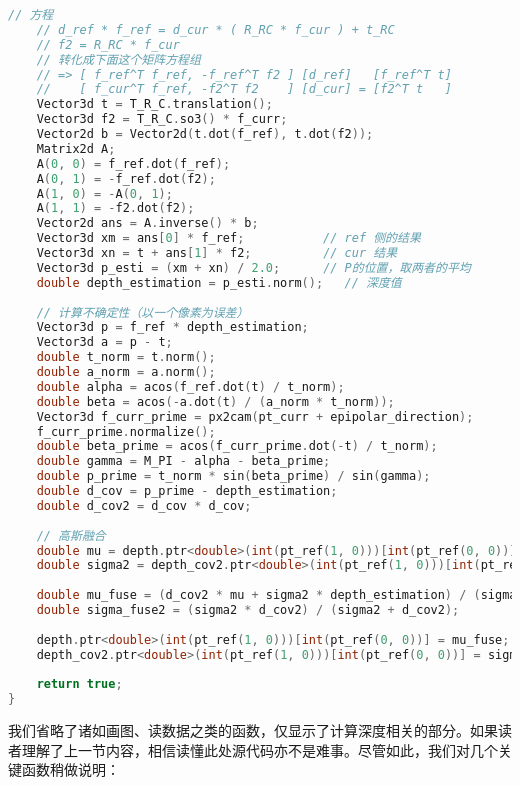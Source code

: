 \begin{lstlisting}[language=c++,caption=slambook2/ch12/dense\_monocular/dense\_mapping.cpp（片段）]
    // 方程
    // d_ref * f_ref = d_cur * ( R_RC * f_cur ) + t_RC
    // f2 = R_RC * f_cur
    // 转化成下面这个矩阵方程组
    // => [ f_ref^T f_ref, -f_ref^T f2 ] [d_ref]   [f_ref^T t]
    //    [ f_cur^T f_ref, -f2^T f2    ] [d_cur] = [f2^T t   ]
    Vector3d t = T_R_C.translation();
    Vector3d f2 = T_R_C.so3() * f_curr;
    Vector2d b = Vector2d(t.dot(f_ref), t.dot(f2));
    Matrix2d A;
    A(0, 0) = f_ref.dot(f_ref);
    A(0, 1) = -f_ref.dot(f2);
    A(1, 0) = -A(0, 1);
    A(1, 1) = -f2.dot(f2);
    Vector2d ans = A.inverse() * b;
    Vector3d xm = ans[0] * f_ref;           // ref 侧的结果
    Vector3d xn = t + ans[1] * f2;          // cur 结果
    Vector3d p_esti = (xm + xn) / 2.0;      // P的位置，取两者的平均
    double depth_estimation = p_esti.norm();   // 深度值
    
    // 计算不确定性（以一个像素为误差）
    Vector3d p = f_ref * depth_estimation;
    Vector3d a = p - t;
    double t_norm = t.norm();
    double a_norm = a.norm();
    double alpha = acos(f_ref.dot(t) / t_norm);
    double beta = acos(-a.dot(t) / (a_norm * t_norm));
    Vector3d f_curr_prime = px2cam(pt_curr + epipolar_direction);
    f_curr_prime.normalize();
    double beta_prime = acos(f_curr_prime.dot(-t) / t_norm);
    double gamma = M_PI - alpha - beta_prime;
    double p_prime = t_norm * sin(beta_prime) / sin(gamma);
    double d_cov = p_prime - depth_estimation;
    double d_cov2 = d_cov * d_cov;
    
    // 高斯融合
    double mu = depth.ptr<double>(int(pt_ref(1, 0)))[int(pt_ref(0, 0))];
    double sigma2 = depth_cov2.ptr<double>(int(pt_ref(1, 0)))[int(pt_ref(0, 0))];
    
    double mu_fuse = (d_cov2 * mu + sigma2 * depth_estimation) / (sigma2 + d_cov2);
    double sigma_fuse2 = (sigma2 * d_cov2) / (sigma2 + d_cov2);
    
    depth.ptr<double>(int(pt_ref(1, 0)))[int(pt_ref(0, 0))] = mu_fuse;
    depth_cov2.ptr<double>(int(pt_ref(1, 0)))[int(pt_ref(0, 0))] = sigma_fuse2;
    
    return true;
}
\end{lstlisting}

我们省略了诸如画图、读数据之类的函数，仅显示了计算深度相关的部分。如果读者理解了上一节内容，相信读懂此处源代码亦不是难事。尽管如此，我们对几个关键函数稍做说明：

